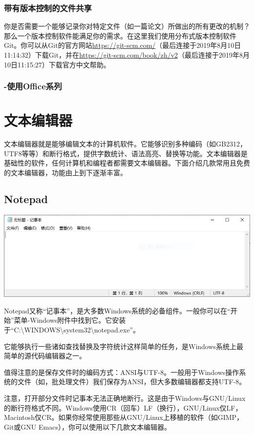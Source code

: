 \subsubsection{带有版本控制的文件共享}
你是否需要一个能够记录你对特定文件（如一篇论文）所做出的所有更改的机制？那么一个版本控制软件能满足你的需求。在这里我们使用分布式版本控制软件Git。你可以从Git的官方网站\url{https://git-scm.com/}（最后连接于2019年8月10日11:14:32）下载Git，并在\url{https://git-scm.com/book/zh/v2}（最后连接于2019年8月10日11:15:27）下载官方中文帮助。
\subsubsection{-使用Office系列}
\section{文本编辑器}
文本编辑器就是能够编辑文本的计算机软件。它能够识别多种编码（如GB2312，UTF8等等）和断行格式，提供字数统计、语法高亮、替换等功能。文本编辑器是基础性的软件，任何计算机和编程者都需要文本编辑器。下面介绍几款常用且免费的文本编辑器，功能由上到下逐渐丰富。
\subsection{Notepad}
\begin{center}
\includegraphics[scale=0.4]{pic/winnotepad.PNG}	
\end{center} \par
Notepad又称“记事本”，是大多数Windows系统的必备组件。一般你可以在“开始”菜单-Windows附件中找到它。它安装于“C:\textbackslash WINDOWS\textbackslash system32\textbackslash notepad.exe”。\par
它能够执行一些诸如查找替换及字符统计这样简单的任务，是Windows系统上最简单的源代码编辑器之一。\par
值得注意的是保存文件时的编码方式：ANSI与UTF-8。一般用于Windows操作系统的文件（如，批处理文件）我们保存为ANSI，但大多数编辑器都支持UTF-8。\par
注意，打开部分文件时记事本无法正确地断行。这是由于Windows与GNU/Linux的断行符格式不同。Windows使用CR（回车）LF（换行），GNU/Linux仅LF，Macintosh仅CR。如果你经常使用那些从GNU/Linux上移植的软件（如GIMP，Git或GNU Emacs），你可以使用以下几款文本编辑器。
